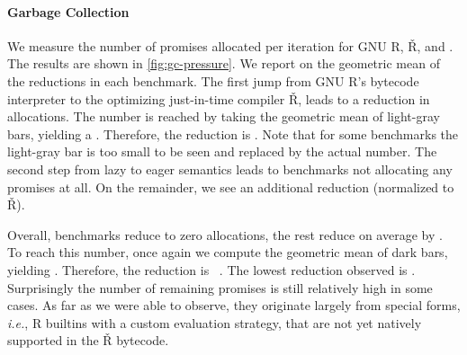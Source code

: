 \documentclass[review,creen,acmsmall]{acmart}
\renewcommand{\Rsh}{{\sf\v R}\xspace}
\newcommand{\ie}{\emph{i.e.},\xspace}
\begin{document}
\paragraph{Garbage Collection}
We measure the number of promises allocated per iteration for GNU R, \Rsh, and
\rshstrict. The results are shown in \autoref{fig:gc-pressure}. We report on the
geometric mean of the reductions in each benchmark. The first jump from GNU R's
bytecode interpreter to the optimizing just-in-time compiler \Rsh, leads to a
\promiseAlocationReductionGnurRsh reduction in allocations. The number is
reached by taking the geometric mean of light-gray bars, yielding a
\promiseAllocationGnurRsh. Therefore, the reduction is
\promiseAlocationReductionGnurRsh. Note that for some benchmarks the light-gray bar is
too small to be seen and replaced by the actual number. The second step from
lazy to eager semantics leads to \promiseAlocationReductionRshStrictToZero
benchmarks not allocating any promises at all. On the remainder, we see an
additional \promiseAlocationReductionRshStrict reduction (\rshstrict normalized
to \Rsh).

Overall, \promiseAlocationReductionRshStrictToZero benchmarks reduce to zero
allocations, the rest reduce on average by
\promiseAlocationReductionGnurRshStrict. To reach this number, once again we
compute the geometric mean of dark bars, yielding
\promiseAllocatioGnurRshStrict. Therefore, the reduction is
~\promiseAlocationReductionGnurRshStrict.
The lowest reduction observed is \promiseAlocationReductionGnurRshStrictMin.
Surprisingly the number of remaining promises is still relatively high in some
cases. As far as we were able to observe, they originate largely from special
forms, \ie R builtins with a custom evaluation strategy, that are not yet
natively supported in the \Rsh bytecode.
\end{document}

